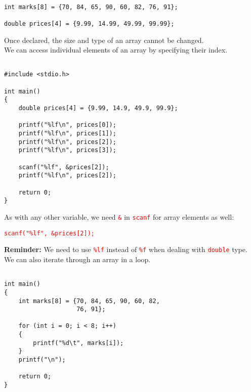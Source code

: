 \documentclass[12pt]{article}
\begin{document}

\begin{verbatim}
	
int marks[8] = {70, 84, 65, 90, 60, 82, 76, 91};

double prices[4] = {9.99, 14.99, 49.99, 99.99};

\end{verbatim}

\vspace{1cm}

\noindent Once declared, the size and type of an array cannot be changed. \\

\noindent We can access individual elements of an array by specifying their index. \\

\begin{verbatim}

#include <stdio.h>

int main()
{
    double prices[4] = {9.99, 14.9, 49.9, 99.9};

    printf("%lf\n", prices[0]);
    printf("%lf\n", prices[1]);
    printf("%lf\n", prices[2]);
    printf("%lf\n", prices[3]);

    scanf("%lf", &prices[2]);
    printf("%lf\n", prices[2]);

    return 0;
}

\end{verbatim}

\vspace{1cm}

\noindent As with any other variable, we need \textcolor{red}{\texttt{\&}} in \textcolor{red}{\texttt{scanf}} for array elements as well: 

\begin{center}
    \textcolor{red}{\texttt{scanf("\%lf", \&prices[2]);}}
\end{center}

\noindent \textbf{Reminder:} We need to use \textcolor{red}{\texttt{\%lf}} instead of \textcolor{red}{\texttt{\%f}} when dealing with \textcolor{red}{\texttt{double}} type. \\

\noindent We can also iterate through an array in a loop.

\begin{verbatim}

int main()
{
    int marks[8] = {70, 84, 65, 90, 60, 82,
                    76, 91};

    for (int i = 0; i < 8; i++)
    {
        printf("%d\t", marks[i]);
    }
    printf("\n");

    return 0;
}

\end{verbatim}
\end{document}

